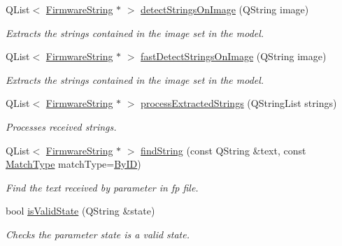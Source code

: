 \begin{DoxyCompactItemize}
Q\+List$<$ \mbox{\hyperlink{classFirmwareString}{Firmware\+String}} $\ast$ $>$ \mbox{\hyperlink{classContextualizationController_ae6817457c7b00d17bb676a4989d59858}{detect\+Strings\+On\+Image}} (Q\+String image)
\begin{DoxyCompactList}\small\item\em Extracts the strings contained in the image set in the model. \end{DoxyCompactList}\item 
Q\+List$<$ \mbox{\hyperlink{classFirmwareString}{Firmware\+String}} $\ast$ $>$ \mbox{\hyperlink{classContextualizationController_a4afb43a5914ef1c7e2a6bb9357cdd822}{fast\+Detect\+Strings\+On\+Image}} (Q\+String image)
\begin{DoxyCompactList}\small\item\em Extracts the strings contained in the image set in the model. \end{DoxyCompactList}\item 
Q\+List$<$ \mbox{\hyperlink{classFirmwareString}{Firmware\+String}} $\ast$ $>$ \mbox{\hyperlink{classContextualizationController_a97436fb5b350bcc6be500b0fe2ecc1b7}{process\+Extracted\+Strings}} (Q\+String\+List strings)
\begin{DoxyCompactList}\small\item\em Processes received strings. \end{DoxyCompactList}\item 
Q\+List$<$ \mbox{\hyperlink{classFirmwareString}{Firmware\+String}} $\ast$ $>$ \mbox{\hyperlink{classContextualizationController_a5f94a4894e3a3c0920dc534346527fa0}{find\+String}} (const Q\+String \&text, const \mbox{\hyperlink{classContextualizationController_a211b7dd2dba820139e8055b4f88fdced}{Match\+Type}} match\+Type=\mbox{\hyperlink{classContextualizationController_a211b7dd2dba820139e8055b4f88fdcedab921b1883492c5a7511b20ec6a5f24f3}{By\+ID}})
\begin{DoxyCompactList}\small\item\em Find the text received by parameter in fp file. \end{DoxyCompactList}\item 
bool \mbox{\hyperlink{classContextualizationController_a0d726ece69d0876729c1c801f9c25230}{is\+Valid\+State}} (Q\+String \&state)
\begin{DoxyCompactList}\small\item\em Checks the parameter state is a valid state. \end{DoxyCompactList}\item 

\end{DoxyCompactItemize}
